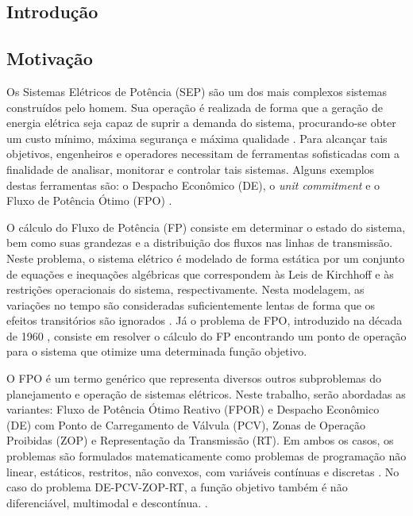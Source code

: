 \documentclass[
	12pt,				%
	openany,			%
	twoside,			%
	a4paper,			%
	chapter=TITLE,		%
	section=Title,		%
	subsection=Title,	%
	subsubsection=Title,%
	english,			%
	french,				%
	spanish,			%
	brazil			%
	]{abntex2}
\begin{document}
\begin{ERRATA}
\textual


\chapter{Introdução}
\section{Motivação}
Os Sistemas Elétricos de Potência (SEP) são um dos mais complexos sistemas construídos pelo homem. Sua operação é realizada de forma que a geração de energia elétrica seja capaz de suprir a demanda do sistema,  procurando-se obter um custo mínimo, máxima segurança e máxima qualidade \cite{teseDiegoNunesSilva}. Para alcançar tais objetivos, engenheiros e operadores necessitam de ferramentas sofisticadas com a finalidade de analisar, monitorar e controlar tais sistemas. Alguns exemplos destas ferramentas são: o Despacho Econômico (DE), o \emph{unit commitment} e o Fluxo de Potência Ótimo (FPO) \cite{psohibrido}.

O cálculo do Fluxo de Potência (FP) consiste em determinar o estado do sistema, bem como suas grandezas e a distribuição dos fluxos
nas linhas de transmissão. Neste problema, o sistema elétrico é modelado de forma estática por
um conjunto de equações e inequações algébricas que correspondem às Leis de  Kirchhoff e às restrições operacionais do sistema, respectivamente. Nesta modelagem, as variações no tempo são consideradas suficientemente lentas de forma que os efeitos transitórios são ignorados \cite{monticelli1983fluxo}. Já o problema de FPO, introduzido na década de 1960 \cite{carpentier}, consiste em resolver o cálculo do FP encontrando um ponto de operação para o sistema que otimize uma determinada função objetivo.

O FPO é um termo genérico que representa diversos outros subproblemas do planejamento e operação de sistemas elétricos. Neste trabalho, serão abordadas as variantes: Fluxo de Potência Ótimo Reativo (FPOR) e Despacho Econômico (DE) com Ponto de Carregamento de Válvula (PCV), Zonas de Operação Proibidas (ZOP) e Representação da Transmissão (RT). Em ambos os casos, os problemas são formulados matematicamente como problemas de programação não linear, estáticos, restritos, não convexos, com variáveis contínuas e discretas \cite{teseDiegoNunesSilva}. No caso do problema DE-PCV-ZOP-RT, a função objetivo também é não diferenciável, multimodal e descontínua. \cite{pinheiro}.



\end{ERRATA}
\end{document}
